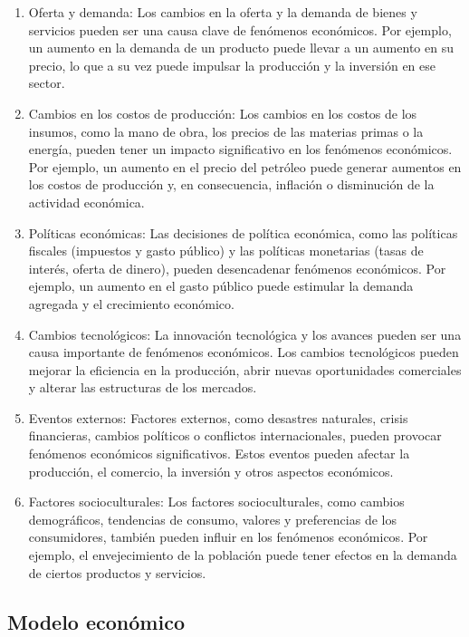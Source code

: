 \documentclass[
  jou,
  floatsintext,
  longtable,
  a4paper,
  nolmodern,
  notxfonts,
  notimes,
  12pt,
  colorlinks=true,linkcolor=blue,citecolor=blue,urlcolor=blue]{apa7}
\begin{document}
\begin{enumerate}
\def\labelenumi{\arabic{enumi}.}
\item
  Oferta y demanda: Los cambios en la oferta y la demanda de bienes y
  servicios pueden ser una causa clave de fenómenos económicos. Por
  ejemplo, un aumento en la demanda de un producto puede llevar a un
  aumento en su precio, lo que a su vez puede impulsar la producción y
  la inversión en ese sector.
\item
  Cambios en los costos de producción: Los cambios en los costos de los
  insumos, como la mano de obra, los precios de las materias primas o la
  energía, pueden tener un impacto significativo en los fenómenos
  económicos. Por ejemplo, un aumento en el precio del petróleo puede
  generar aumentos en los costos de producción y, en consecuencia,
  inflación o disminución de la actividad económica.
\item
  Políticas económicas: Las decisiones de política económica, como las
  políticas fiscales (impuestos y gasto público) y las políticas
  monetarias (tasas de interés, oferta de dinero), pueden desencadenar
  fenómenos económicos. Por ejemplo, un aumento en el gasto público
  puede estimular la demanda agregada y el crecimiento económico.
\item
  Cambios tecnológicos: La innovación tecnológica y los avances pueden
  ser una causa importante de fenómenos económicos. Los cambios
  tecnológicos pueden mejorar la eficiencia en la producción, abrir
  nuevas oportunidades comerciales y alterar las estructuras de los
  mercados.
\item
  Eventos externos: Factores externos, como desastres naturales, crisis
  financieras, cambios políticos o conflictos internacionales, pueden
  provocar fenómenos económicos significativos. Estos eventos pueden
  afectar la producción, el comercio, la inversión y otros aspectos
  económicos.
\item
  Factores socioculturales: Los factores socioculturales, como cambios
  demográficos, tendencias de consumo, valores y preferencias de los
  consumidores, también pueden influir en los fenómenos económicos. Por
  ejemplo, el envejecimiento de la población puede tener efectos en la
  demanda de ciertos productos y servicios.
\end{enumerate}

\subsection{Modelo económico}\label{modelo-econuxf3mico}
\end{document}
